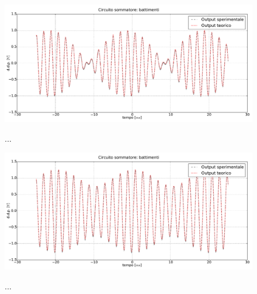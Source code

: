 \begin{figure}[ht]
 \centering
   {\includegraphics[width=18cm]{../E01/latex/battimenti_ideali.pdf}}
 \caption{...}
 \label{gr:onde1}
\end{figure}



\begin{figure}[H]
 \centering
   {\includegraphics[width=18cm]{../E01/latex/battimenti.pdf}}
 \caption{...}
 \label{gr:onde1}
\end{figure}















